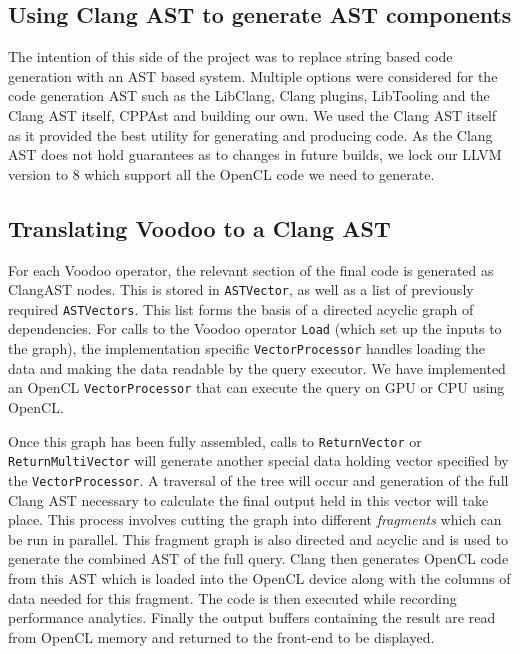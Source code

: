 \subsection{Using Clang AST to generate AST components}

The intention of this side of the project was to replace string based code generation with an AST based system. Multiple options were considered for the code generation AST such as the LibClang, Clang plugins, LibTooling and the Clang AST itself, CPPAst and building our own. We used the Clang AST itself as it provided the best utility for generating and producing code. As the Clang AST does not hold guarantees as to changes in future builds, we lock our LLVM version to 8 which support all the OpenCL code we need to generate.

\subsection{Translating Voodoo to a Clang AST} \label{voodoo-to-ast}

For each Voodoo operator, the relevant section of the final code is generated as ClangAST nodes. This is stored in \texttt{ASTVector}, as well as a list of previously required \texttt{ASTVectors}. This list forms the basis of a directed acyclic graph of dependencies. For calls to the Voodoo operator \texttt{Load} (which set up the inputs to the graph), the implementation specific \texttt{VectorProcessor} handles loading the data and making the data readable by the query executor. We have implemented an OpenCL \texttt{VectorProcessor} that can execute the query on GPU or CPU using OpenCL.

Once this graph has been fully assembled, calls to \texttt{ReturnVector} or \texttt{ReturnMultiVector} will generate another special data holding vector specified by the \texttt{VectorProcessor}. A traversal of the tree will occur and generation of the full Clang AST necessary to calculate the final output held in this vector will take place. This process involves cutting the graph into different \emph{fragments} which can be run in parallel. This fragment graph is also directed and acyclic and is used to generate the combined AST of the full query. Clang then generates OpenCL code from this AST which is loaded into the OpenCL device along with the columns of data needed for this fragment. The code is then executed while recording performance analytics. Finally the output buffers containing the result are read from OpenCL memory and returned to the front-end to be displayed.

